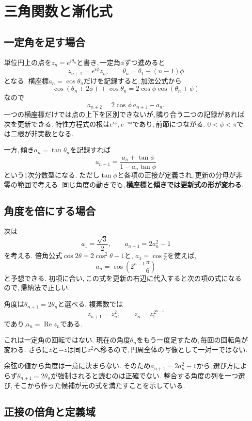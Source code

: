 \section{三角関数と漸化式}\label{節：三角関数と漸化式}
\subsection{一定角を足す場合}

単位円上の点を$z_n=e^{i\theta_n}$と書き,\,一定角$\phi$ずつ進めると
\[
 z_{n+1}=e^{i\phi}z_n,\qquad
 \theta_n=\theta_1+(n-1)\phi
\]
となる.
横座標$a_n=\cos\theta_n$だけを記録すると,\,加法公式から
\[
 \cos(\theta_n+2\phi)+\cos\theta_n
 =2\cos\phi\cos(\theta_n+\phi)
\]
なので
\[
 a_{n+2}=2\cos\phi\,a_{n+1}-a_n.
\]
一つの横座標だけでは点の上下を区別できないが,\,隣り合う二つの記録があれば次を更新できる.
特性方程式の根は$e^{i\phi},e^{-i\phi}$であり,\,前節につながる.
$0<\phi<\pi$では二根が非実数となる.

一方,\,傾き$a_n=\tan\theta_n$を記録すれば
\[
 a_{n+1}=\frac{a_n+\tan\phi}{1-a_n\tan\phi}
\]
という1次分数型になる.
ただし$\tan\phi$と各項の正接が定義され,\,更新の分母が非零の範囲で考える.
同じ角度の動きでも,\,\textbf{横座標と傾きでは更新式の形が変わる}.

\subsection{角度を倍にする場合}

次は
\[
 a_1=\frac{\sqrt3}{2},\qquad a_{n+1}=2a_n^2-1
\]
を考える.
倍角公式$\cos2\theta=2\cos^2\theta-1$と,
$a_1=\cos\frac{\pi}{6}$を使えば,
\[
 a_n=\cos\left(2^{n-1}\frac{\pi}{6}\right)
\]
と予想できる.
初項に合い,\,この式を更新の右辺に代入すると次の項の式になるので,\,帰納法で正しい.

角度は$\theta_{n+1}=2\theta_n$と選べる.
複素数では
\[
 z_{n+1}=z_n^2,\qquad z_n=z_1^{\,2^{n-1}}
\]
であり,$a_n=\operatorname{Re}z_n$である.
\NewFigDoubling

これは一定角の回転ではない.
現在の角度$\theta_n$をもう一度足すため,\,毎回の回転角が変わる.
さらに$z$と$-z$は同じ$z^2$へ移るので,\,円周全体の写像として一対一ではない.

余弦の値から角度は一意に決まらない.
そのため$a_{n+1}=2a_n^2-1$から,\,選び方によらず$\theta_{n+1}=2\theta_n$が強制されると読むのは正確でない.
整合する角度の列を一つ選び,\,そこから作った候補が元の式を満たすことを示している.

\subsection{正接の倍角と定義域}

